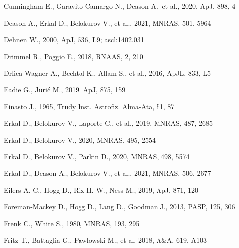 \documentclass[usenatbib,fleqn]{mnras}
\begin{document}
\begin{thebibliography}{}
Cunningham E., Garavito-Camargo N., Deason A., et al., 2020, ApJ, 898, 4

Deason A., Erkal D., Belokurov V., et al., 2021, MNRAS, 501, 5964

Dehnen W., 2000, ApJ, 536, L9; ascl:1402.031

Drimmel R., Poggio E., 2018, RNAAS, 2, 210

Drlica-Wagner A., Bechtol K., Allam S., et al., 2016, ApJL, 833, L5

Eadie G., Juri\'c M., 2019, ApJ, 875, 159

Einasto J., 1965, Trudy Inst. Astrofiz. Alma-Ata, 51, 87

Erkal D., Belokurov V., Laporte C., et al., 2019, MNRAS, 487, 2685

Erkal D., Belokurov V., 2020, MNRAS, 495, 2554

Erkal D., Belokurov V., Parkin D., 2020, MNRAS, 498, 5574

Erkal D., Deason A., Belokurov V., et al., 2021, MNRAS, 506, 2677


Eilers A.-C., Hogg D., Rix H.-W., Ness M., 2019, ApJ, 871, 120

Foreman-Mackey D., Hogg D., Lang D., Goodman J., 2013, PASP, 125, 306

Frenk C., White S., 1980, MNRAS, 193, 295

Fritz T., Battaglia G., Pawlowski M., et al. 2018, A\&A, 619, A103


\end{thebibliography}
\end{document}
